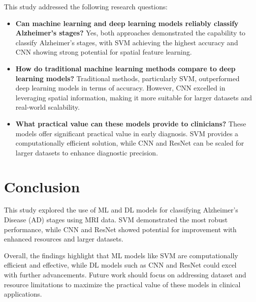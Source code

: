 \documentclass[runningheads]{llncs}
\begin{document}
This study addressed the following research questions:
\begin{itemize}
    \item \textbf{Can machine learning and deep learning models reliably classify Alzheimer’s stages?} Yes, both approaches demonstrated the capability to classify Alzheimer’s stages, with SVM achieving the highest accuracy and CNN showing strong potential for spatial feature learning.
    \item \textbf{How do traditional machine learning methods compare to deep learning models?} Traditional methods, particularly SVM, outperformed deep learning models in terms of accuracy. However, CNN excelled in leveraging spatial information, making it more suitable for larger datasets and real-world scalability.
    \item \textbf{What practical value can these models provide to clinicians?} These models offer significant practical value in early diagnosis. SVM provides a computationally efficient solution, while CNN and ResNet can be scaled for larger datasets to enhance diagnostic precision.
\end{itemize}

\section{Conclusion}

This study explored the use of ML and DL models for classifying Alzheimer’s Disease (AD) stages using MRI data. SVM demonstrated the most robust performance, while CNN and ResNet showed potential for improvement with enhanced resources and larger datasets.

Overall, the findings highlight that ML models like SVM are computationally efficient and effective, while DL models such as CNN and ResNet could excel with further advancements. Future work should focus on addressing dataset and resource limitations to maximize the practical value of these models in clinical applications.



\sloppy


\end{document}
